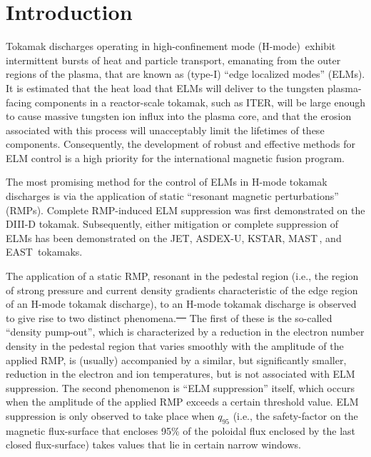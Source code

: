 \documentclass[12pt,prb,aps]{revtex4-1}
\providecommand{\DIFadd}[1]{{\protect\color{blue}\uwave{#1}}} %
\providecommand{\DIFdel}[1]{{\protect\color{red}\sout{#1}}}                      %
\providecommand{\DIFaddbegin}{} %
\providecommand{\DIFaddend}{} %
\providecommand{\DIFdelbegin}{} %
\providecommand{\DIFdelend}{} %
\begin{document}
\maketitle

\section{Introduction}
Tokamak discharges operating in high-confinement mode (H-mode)\,\cite{wagner} exhibit intermittent bursts of heat and particle transport, 
emanating from the outer regions of the plasma, that are known as  (type-I) ``edge localized modes'' (ELMs).\cite{zohm}
It is estimated that the heat load that ELMs
will deliver to the tungsten plasma-facing components in a reactor-scale tokamak, such as ITER, will be large enough to cause
massive tungsten ion influx into the plasma core, and that the erosion associated with this process will 
unacceptably limit the lifetimes of these components.\cite{loarte} Consequently, the development of robust and effective
methods for ELM control is a high priority for the international magnetic fusion program. 

The most promising method for the control of ELMs in H-mode tokamak discharges is via the application of static   ``resonant magnetic perturbations'' (RMPs). Complete RMP-induced 
ELM suppression was first demonstrated on the DIII-D tokamak.\cite{evans} Subsequently, either mitigation or complete suppression of
ELMs has been demonstrated on the JET,\cite{jet} ASDEX-U,\cite{asdex} KSTAR,\cite{kstar} MAST\,\cite{mast}, and EAST\,\cite{east} tokamaks.

The application of a static RMP, resonant in the pedestal region (i.e., the region of strong pressure and current density gradients characteristic of the edge region of an H-mode 
tokamak discharge), to an H-mode tokamak discharge is observed to give rise to  two distinct phenomena.\DIFdelbegin \DIFdel{\mbox{%
\cite{schmitz, lanctot,paz1,d158115,paz} }\hspace{0pt}%
}\DIFdelend \DIFaddbegin \DIFadd{\mbox{%
\cite{schmitz, lanctot,paz1,d158115,lyons,paz} }\hspace{0pt}%
}\DIFaddend The first of these  is the 
so-called ``density pump-out'', which  is characterized by a reduction in the electron number density
in the pedestal region that varies smoothly with the amplitude of the applied RMP,  is (usually) accompanied by a similar, but significantly smaller, reduction
in the electron and ion temperatures, but  is not associated with ELM suppression. The second phenomenon is  ``ELM suppression'' itself, which 
 occurs when the amplitude of the applied RMP exceeds a certain threshold value. 
ELM suppression  is only observed to take place when $q_{95}$ (i.e., the safety-factor on the magnetic flux-surface that encloses 95\% of the poloidal flux enclosed by
the last closed flux-surface) takes values that lie in certain narrow windows. \cite{paz1,d158115}
\end{document}
